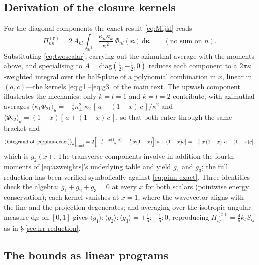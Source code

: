 \documentclass[lineno]{JFM-FLM_Au}
\begin{document}
\subsection{Derivation of the closure kernels}\label{app:kernels}

For the diagonal components the exact result \eqref{eq:Mijkl} reads
\begin{equation}
  \Pi^{(\mathrm r)}_{nn}
  = 2\,A_{kl}\int_{\mathbb{R}^3}
    \frac{\kappa_n\kappa_k}{\kappa^2}\,
    \Phi_{nl}(\boldsymbol{\kappa})\,\mathrm{d}\boldsymbol{\kappa}
  \qquad(\text{no sum on }n).
  \label{eq:pinn-exact}
\end{equation}
Substituting \eqref{eq:twoscalar}, carrying out the azimuthal average with
the moments above, and specialising to
$A=\mathrm{diag}(\tfrac12,-\tfrac12,0)$ reduces each component to a
$2\pi\kappa_\perp$-weighted integral over the half-plane of a polynomial
combination in $x$, linear in $(a,c)$---the kernels
\eqref{eq:g1}--\eqref{eq:g3} of the main text. The upwash component
illustrates the mechanics: only $k=l=1$ and $k=l=2$ contribute, with
azimuthal averages
$\langle\kappa_1\Phi_{21}\rangle_\theta
=-\tfrac12\kappa_\perp^2\,\kappa_2\,[\,a+(1-x)\,c\,]/\kappa^2$
and
$\langle\Phi_{22}\rangle_\theta=(1-x)[\,a+(1-x)\,c\,]$, so that both enter
through the same bracket and
\begin{equation}
  \bigl\langle\text{integrand of \eqref{eq:pinn-exact}}\bigr\rangle_\theta
  \Big|_{n=2}
  = 2\Bigl[-\tfrac12\cdot\tfrac{x(1-x)}{2}
           -\tfrac12\,x(1-x)\Bigr]\bigl[a+(1-x)c\bigr]
  = -\tfrac32\,x\,(1-x)\bigl[a+(1-x)c\bigr],
  \label{eq:g2derive}
\end{equation}
which is $g_2(x)$. The transverse components involve in addition the
fourth moments of \eqref{eq:azweights}'s underlying table and yield
$g_1$ and $g_3$; the full reduction has been verified symbolically against
\eqref{eq:pinn-exact}. Three identities check the algebra:
$g_1+g_2+g_3=0$ at every $x$ for both scalars (pointwise energy
conservation); each kernel vanishes at $x=1$, where the wavevector aligns
with the line and the projection degenerates; and averaging over the
isotropic angular measure $\mathrm{d}\mu$ on $[0,1]$ gives
$\langle g_1\rangle:\langle g_2\rangle:\langle g_3\rangle
=+\tfrac15:-\tfrac15:0$, reproducing
$\Pi^{(\mathrm r)}_{ij}=\tfrac45 k_tS_{ij}$ \citep{Crow1968} as in
\S\,\ref{sec:lrr-reduction}.

\subsection{The bounds as linear programs}\label{app:lp}
\end{document}
